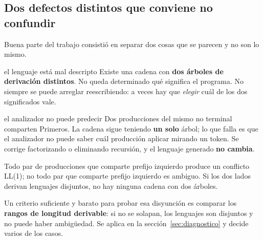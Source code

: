 \subsection{Dos defectos distintos que conviene no confundir}
\label{sec:dos-defectos}

Buena parte del trabajo consistió en separar dos cosas que se parecen y no son lo mismo.

\begin{ambiguedad}{el lenguaje está mal descripto}
Existe una cadena con \textbf{dos árboles de derivación distintos}. No queda determinado qué
significa el programa. No siempre se puede arreglar reescribiendo: a veces hay que \emph{elegir}
cuál de los dos significados vale.
\end{ambiguedad}

\begin{conflicto}{el analizador no puede predecir}
Dos producciones del mismo no terminal comparten Primeros. La cadena sigue teniendo \textbf{un
solo} árbol; lo que falla es que el analizador no puede saber cuál producción aplicar mirando un
token. Se corrige factorizando o eliminando recursión, y el lenguaje generado \textbf{no cambia}.
\end{conflicto}

Todo par de producciones que comparte prefijo izquierdo produce un conflicto LL(1); no
todo par que comparte prefijo izquierdo es ambiguo. Si los dos lados derivan lenguajes disjuntos,
no hay ninguna cadena con dos árboles.

Un criterio suficiente y barato para probar esa disyunción es comparar los \textbf{rangos de
longitud derivable}: si no se solapan, los lenguajes son disjuntos y no puede haber ambigüedad.
Se aplica en la sección~\ref{sec:diagnostico} y decide varios de los casos.
